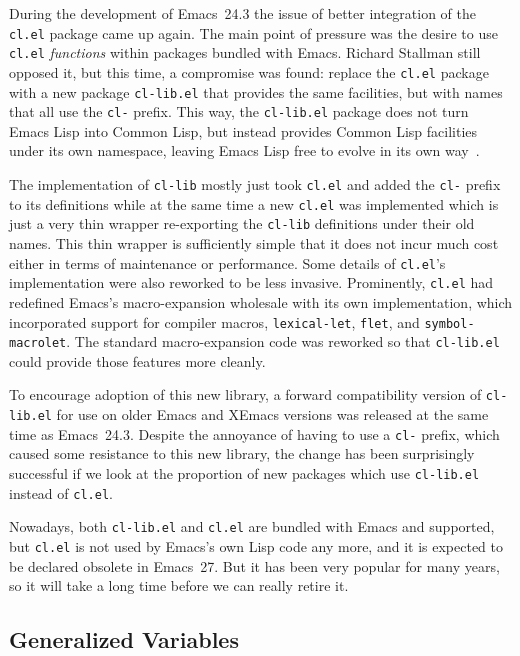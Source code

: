 \documentclass[format=acmsmall,screen]{acmart}
\newcommand \Elisp {Emacs Lisp}
\begin{document}
During the development of Emacs~24.3 the issue of better integration of the
\texttt{cl.el} package came up again.  The main point of pressure was the
desire to use \texttt{cl.el} \emph{functions} within packages bundled with
Emacs.  Richard Stallman still opposed it, but this time, a compromise was
found: replace the \texttt{cl.el} package with a new package
\texttt{cl-lib.el} that provides the same facilities, but with names that
all use the \texttt{cl-} prefix.  This way, the \texttt{cl-lib.el} package
does not turn \Elisp{} into Common Lisp, but instead provides Common Lisp
facilities under its own namespace, leaving \Elisp{} free to evolve in its
own way~\cite{RMS-cl-real}.

The implementation of \texttt{cl-lib} mostly just took \texttt{cl.el} and
added the \texttt{cl-} prefix to its definitions while at the same time
a new \texttt{cl.el} was implemented which is just a very thin wrapper
re-exporting the \texttt{cl-lib} definitions under their old names.
This thin wrapper is sufficiently
simple that it does not incur much cost either in terms of maintenance
or performance.
Some details of \texttt{cl.el}'s implementation were also reworked to be
less invasive.  Prominently, \texttt{cl.el} had redefined Emacs's
macro-expansion wholesale with its own implementation, which incorporated
support for compiler macros, \texttt{lexical-let}, \texttt{flet}, and
\texttt{symbol-macrolet}.  The standard
macro-expansion code was reworked so that \texttt{cl-lib.el} could provide those features
more cleanly.

To encourage adoption of this new library, a forward compatibility version
of \texttt{cl-lib.el} for use on older Emacs and XEmacs versions was
released at the same time as Emacs~24.3.  Despite the annoyance of having to
use a \texttt{cl-} prefix, which caused some resistance to this new library,
the change has been surprisingly successful if we look at the proportion of
new packages which use \texttt{cl-lib.el} instead of \texttt{cl.el}.

Nowadays, both \texttt{cl-lib.el} and \texttt{cl.el} are bundled with Emacs
and supported, but \texttt{cl.el} is not used by Emacs's own Lisp code any
more, and it is expected to be declared obsolete in Emacs~27.
But it has been very popular for many years, so it will take a long time
before we can really retire it.  

\subsection{Generalized Variables} %
\label{sec:generalized-variables}
\end{document}
